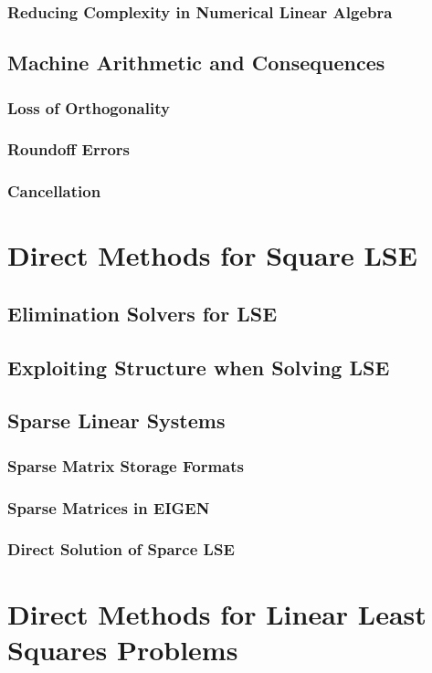 \documentclass[12pt]{article}
\begin{document}
\subsubsection{Reducing Complexity in Numerical Linear Algebra}
\subsection{Machine Arithmetic and Consequences}
\subsubsection{Loss of Orthogonality}
\subsubsection{Roundoff Errors}
\subsubsection{Cancellation}

\section{Direct Methods for Square LSE}
\subsection{Elimination Solvers for LSE}
\subsection{Exploiting Structure when Solving LSE}
\subsection{Sparse Linear Systems}
\subsubsection{Sparse Matrix Storage Formats}
\subsubsection{Sparse Matrices in EIGEN}
\subsubsection{Direct Solution of Sparce LSE}

\section{Direct Methods for Linear Least Squares Problems}
\end{document}

